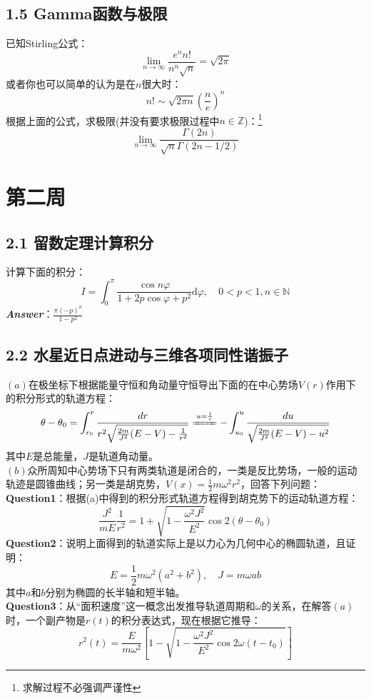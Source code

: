 \documentclass[UTF8,fontset=windows,oneside]{ctexbook}
\begin{document}
\subsection*{1.5 Gamma函数与极限}
已知Stirling公式：
\begin{equation}
	\label{eq:2}
    \lim_{n\to\infty}\frac{e^nn!}{n^n\sqrt{n}}=\sqrt{2\pi}
\end{equation}
或者你也可以简单的认为是在$n$很大时：
\begin{equation}
    n!\sim\sqrt{2\pi n}\left(\frac{n}{e}\right)^n
\end{equation}
根据上面的公式，求极限(并没有要求极限过程中$n\in\mathbb{Z}$)：\footnote{求解过程不必强调严谨性}
\[\lim_{n\to\infty}\frac{\Gamma(2n)}{\sqrt{n}\Gamma(2n-1/2)}\]

\section*{第二周}
\subsection*{2.1 留数定理计算积分}
计算下面的积分：
\begin{equation}
    I=\int_{0}^{\pi}\frac{\cos n\varphi}{1+2p\cos\varphi+p^2}\mathrm{d}\varphi,\quad 0<p<1,n\in \mathbb{N}
\end{equation}
{\itshape \textbf{Answer}}：$\frac{\pi(-p)^n}{1-p^2}$

\subsection*{2.2 水星近日点进动与三维各项同性谐振子}
\noindent $(a)$在极坐标下根据能量守恒和角动量守恒导出下面的在中心势场$V(r)$作用下的积分形式的轨道方程：
\begin{equation}
    \theta-\theta_0=\int_{r_0}^{r}\frac{dr}{r^2\sqrt{\frac{2m}{J^2}(E-V)-\frac{1}{r^2}}}\xlongequal{u=\frac{1}{r}}-\int_{u_0}^{u}\frac{du}{\sqrt{\frac{2m}{J^2}(E-V)-u^2}}
\end{equation}
其中$E$是总能量，$J$是轨道角动量。\\
$(b)$众所周知中心势场下只有两类轨道是闭合的，一类是反比势场，一般的运动轨迹是圆锥曲线；另一类是胡克势，$V(x)=\frac{1}{2}m\omega^2r^2$，回答下列问题：\\
\textbf{Question1}：根据(a)中得到的积分形式轨道方程得到胡克势下的运动轨道方程：
\begin{equation}
    \frac{J^2}{mE}\frac{1}{r^2}=1+\sqrt{1-\frac{\omega^2J^2}{E^2}}\cos 2(\theta-\theta_0)
\end{equation}
\textbf{Question2}：说明上面得到的轨道实际上是以力心为几何中心的椭圆轨道，且证明：
\[E=\frac{1}{2}m\omega^2(a^2+b^2),\quad J=m\omega ab\]
其中$a$和$b$分别为椭圆的长半轴和短半轴。\\
\textbf{Question3}：从“面积速度”这一概念出发推导轨道周期和$\omega$的关系，在解答$(a)$时，一个副产物是$r(t)$的积分表达式，现在根据它推导：
\begin{equation}
    r^2(t)=\frac{E}{m\omega^2}\left[1-\sqrt{1-\frac{\omega^2J^2}{E^2}\cos 2\omega(t-t_0)}\right]
\end{equation}
\end{document}
